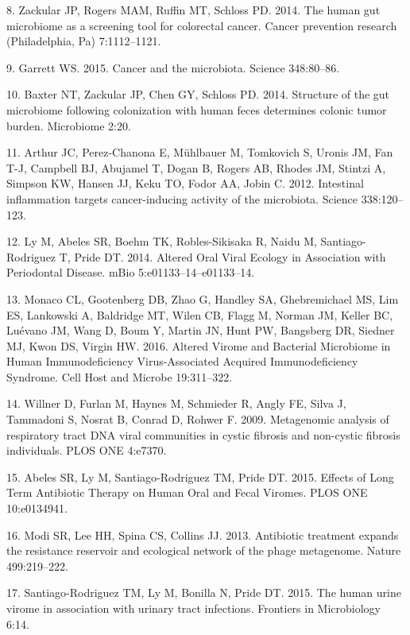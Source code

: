 \documentclass[12pt,]{article}
\begin{document}
\hypertarget{ref-Zackular:2014fba}{}
8. Zackular JP, Rogers MAM, Ruffin MT, Schloss PD. 2014. The human gut
microbiome as a screening tool for colorectal cancer. Cancer prevention
research (Philadelphia, Pa) 7:1112--1121.

\hypertarget{ref-Garrett:2015fg}{}
9. Garrett WS. 2015. Cancer and the microbiota. Science 348:80--86.

\hypertarget{ref-Baxter:2014hb}{}
10. Baxter NT, Zackular JP, Chen GY, Schloss PD. 2014. Structure of the
gut microbiome following colonization with human feces determines
colonic tumor burden. Microbiome 2:20.

\hypertarget{ref-Arthur:2012kl}{}
11. Arthur JC, Perez-Chanona E, Mühlbauer M, Tomkovich S, Uronis JM, Fan
T-J, Campbell BJ, Abujamel T, Dogan B, Rogers AB, Rhodes JM, Stintzi A,
Simpson KW, Hansen JJ, Keku TO, Fodor AA, Jobin C. 2012. Intestinal
inflammation targets cancer-inducing activity of the microbiota. Science
338:120--123.

\hypertarget{ref-Ly:2014ew}{}
12. Ly M, Abeles SR, Boehm TK, Robles-Sikisaka R, Naidu M,
Santiago-Rodriguez T, Pride DT. 2014. Altered Oral Viral Ecology in
Association with Periodontal Disease. mBio 5:e01133--14--e01133--14.

\hypertarget{ref-Monaco:2016ita}{}
13. Monaco CL, Gootenberg DB, Zhao G, Handley SA, Ghebremichael MS, Lim
ES, Lankowski A, Baldridge MT, Wilen CB, Flagg M, Norman JM, Keller BC,
Luévano JM, Wang D, Boum Y, Martin JN, Hunt PW, Bangsberg DR, Siedner
MJ, Kwon DS, Virgin HW. 2016. Altered Virome and Bacterial Microbiome in
Human Immunodeficiency Virus-Associated Acquired Immunodeficiency
Syndrome. Cell Host and Microbe 19:311--322.

\hypertarget{ref-Willner:2009dq}{}
14. Willner D, Furlan M, Haynes M, Schmieder R, Angly FE, Silva J,
Tammadoni S, Nosrat B, Conrad D, Rohwer F. 2009. Metagenomic analysis of
respiratory tract DNA viral communities in cystic fibrosis and
non-cystic fibrosis individuals. PLOS ONE 4:e7370.

\hypertarget{ref-Abeles:2015dy}{}
15. Abeles SR, Ly M, Santiago-Rodriguez TM, Pride DT. 2015. Effects of
Long Term Antibiotic Therapy on Human Oral and Fecal Viromes. PLOS ONE
10:e0134941.

\hypertarget{ref-Modi:2013fi}{}
16. Modi SR, Lee HH, Spina CS, Collins JJ. 2013. Antibiotic treatment
expands the resistance reservoir and ecological network of the phage
metagenome. Nature 499:219--222.

\hypertarget{ref-SantiagoRodriguez:2015gd}{}
17. Santiago-Rodriguez TM, Ly M, Bonilla N, Pride DT. 2015. The human
urine virome in association with urinary tract infections. Frontiers in
Microbiology 6:14.
\end{document}
